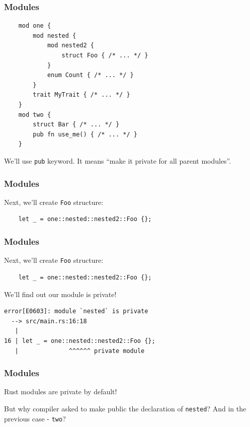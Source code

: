 \documentclass[aspectratio=1610,t]{beamer}
\begin{document}

\begin{frame}[fragile]
\frametitle{Modules}
\begin{verbatim}
    mod one {
        mod nested {
            mod nested2 {
                struct Foo { /* ... */ }
            }
            enum Count { /* ... */ }
        }
        trait MyTrait { /* ... */ }
    }
    mod two {
        struct Bar { /* ... */ }
        pub fn use_me() { /* ... */ }
    }
\end{verbatim}

We'll use \texttt{pub} keyword. It means ``make it private for all parent modules''.
\end{frame}


\begin{frame}[fragile]
\frametitle{Modules}
Next, we'll create \texttt{Foo} structure:

\begin{verbatim}
    let _ = one::nested::nested2::Foo {};
\end{verbatim}
\end{frame}


\begin{frame}[fragile]
\frametitle{Modules}
Next, we'll create \texttt{Foo} structure:

\begin{verbatim}
    let _ = one::nested::nested2::Foo {};
\end{verbatim}

We'll find out our module is private!

\begin{verbatim}
error[E0603]: module `nested` is private
  --> src/main.rs:16:18
   |
16 | let _ = one::nested::nested2::Foo {};
   |              ^^^^^^ private module
\end{verbatim}
\end{frame}


\begin{frame}[fragile]
\frametitle{Modules}
Rust modules are private by default!

But why compiler asked to make public the declaration of \texttt{nested}? And in the previous case - \texttt{two}?


\end{frame}
\end{document}
